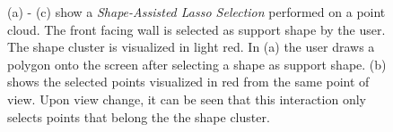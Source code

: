 \begin{figure}
\centering
{}\par\medskip
{}\par\medskip        
{}
\caption{(a) - (c) show a \textit{Shape-Assisted Lasso Selection} performed on a point cloud. The front facing wall is selected as support shape by the user. The shape cluster is visualized in light red. In (a) the user draws a polygon onto the screen after selecting a shape as support shape. (b) shows the selected points visualized in red from the same point of view. Upon view change, it can be seen that this interaction only selects points that belong the the shape cluster. }
\label{fig:lasso_assisted}
\end{figure}


